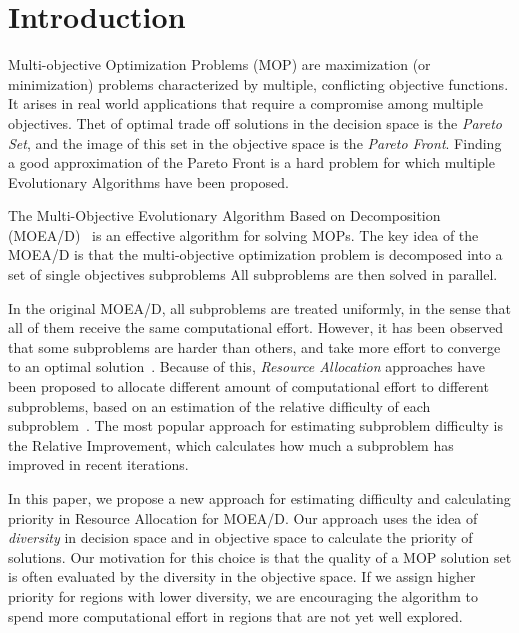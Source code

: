 \section{Introduction}

Multi-objective Optimization Problems (MOP) are maximization (or minimization)
problems characterized by multiple, conflicting objective functions. It arises
in real world applications that require a compromise among multiple objectives.
Thet of optimal trade off solutions in the decision space is the \emph{Pareto
Set}, and the image of this set in the objective space is the \emph{Pareto
Front}. Finding a good approximation of the Pareto Front is a hard problem for
which multiple Evolutionary Algorithms have been proposed.

The Multi-Objective Evolutionary Algorithm Based on Decomposition
(MOEA/D)~\cite{zhang2007moea} is an effective algorithm for solving MOPs. The
key idea of the MOEA/D is that the multi-objective optimization problem is
decomposed into a set of single objectives subproblems All subproblems
are then solved in parallel.

In the original MOEA/D, all subproblems are treated uniformly, in the sense that
all of them receive the same computational effort. However, it has been observed
that some subproblems are harder than others, and take more effort to converge
to an optimal solution~\cite{zhou2016all}. Because of this, \emph{Resource
Allocation} approaches have been proposed to allocate different amount of
computational effort to different subproblems, based on an estimation of the
relative difficulty of each subproblem~\cite{zhou2016all, zhang2009performance,
kang2018collaborative}. The most popular approach for estimating subproblem
difficulty is the Relative Improvement, which calculates how much a subproblem
has improved in recent iterations.

In this paper, we propose a new approach for estimating difficulty and
calculating priority in Resource Allocation for MOEA/D. Our approach uses the
idea of \emph{diversity} in decision space and in objective space to calculate
the priority of solutions. Our motivation for this choice is that the quality of
a MOP solution set is often evaluated by the diversity in the objective space.
If we assign higher priority for regions with lower diversity, we are
encouraging the algorithm to spend more computational effort in regions that are
not yet well explored.

